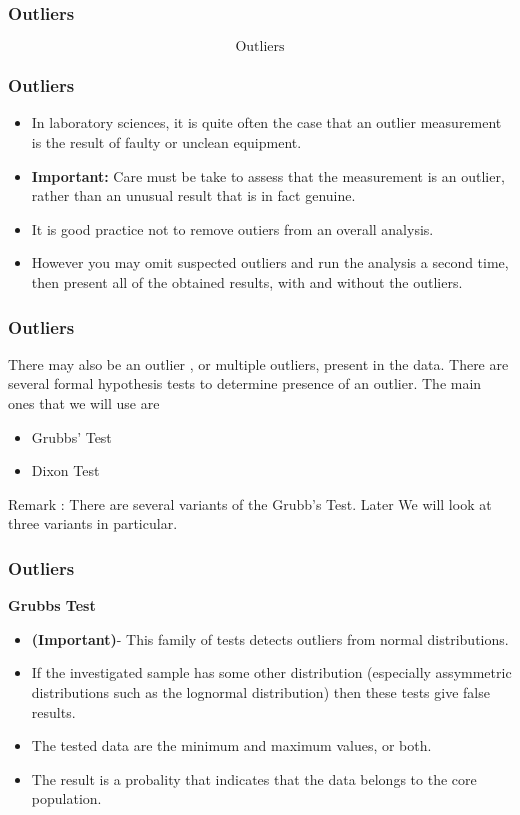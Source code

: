 \documentclass{beamer}
\begin{document}
\begin{frame}[fragile]
	\frametitle{Outliers}
	\LARGE
	\[ \mbox{Outliers} \]
\end{frame}	
\begin{frame}[fragile]
\frametitle{Outliers}
\Large
\begin{itemize}
\item In laboratory sciences, it is quite often the case that an outlier measurement is the result of faulty or unclean equipment. 
\item \textbf{Important:} Care must be take to assess that the measurement is an outlier, rather than an unusual result that is in fact genuine.
\item It is good practice not to remove outiers from an overall analysis. 
\item However you may omit suspected outliers and run the analysis a second time, then present all of the obtained results, with and without the outliers.
\end{itemize}
\end{frame}
\begin{frame}[fragile]
	\frametitle{Outliers}
	\Large

	
	There may also be an outlier , or multiple outliers, present in the data. There are several formal  hypothesis tests to determine presence of an outlier. The main ones that we will use are
	
	\begin{itemize}
		\item Grubbs' Test
		\item Dixon Test
	\end{itemize}
	\bigskip
	Remark : There are several variants of the Grubb's Test. Later We will look at three variants in particular.
\end{frame}
\begin{frame}[fragile]
	\frametitle{Outliers}
	\Large
	\textbf{Grubbs Test }


\begin{itemize}
\item 
\textbf{(Important)}- This family of tests detects outliers from normal distributions. 
\bigskip
\item If the investigated sample has some other distribution (especially
assymmetric distributions such as the lognormal distribution) then these tests give false results.\bigskip

\item The tested data are the
minimum and maximum values, or both.  \bigskip
\item The result is a probality that indicates that the data
belongs to the core population.
\end{itemize}
\end{frame}
\end{document}
